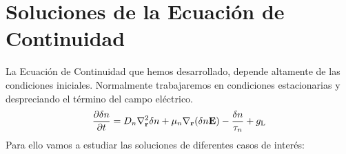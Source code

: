 \chapter{Soluciones de la Ecuación de Continuidad} \label{sec: Soluciones de la Ecuacion de Continuidad}
\pagestyle{fancy}
La Ecuación de Continuidad que hemos desarrollado, depende altamente de las condiciones iniciales. Normalmente trabajaremos en condiciones estacionarias y despreciando el término del campo eléctrico.
\begin{equation}
    \pdiff[]{\delta n}{t}=D_n \nabla_\mathbf{r}^2 \delta n+ \mu_n \nabla_\mathbf{r} (\delta n\mathbf{E})-\frac{\delta n}{\tau_n}+g_\mathrm{L}
\end{equation}
Para ello vamos a estudiar las soluciones de diferentes casos de interés:
